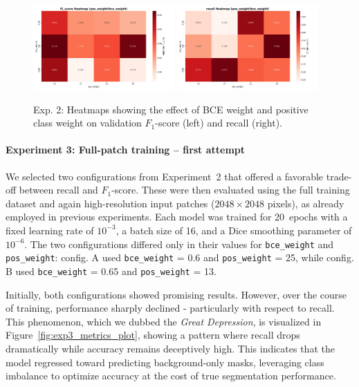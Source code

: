 \documentclass[12pt]{article}
\begin{document}
\begin{figure}[t]
    \centering
    \includegraphics[width=0.48\textwidth]{Images/12_heatmap_f1_score_by_weights.png}
    \includegraphics[width=0.48\textwidth]{Images/12_heatmap_recall_by_weights.png}
    \caption{Exp. 2: Heatmaps showing the effect of BCE weight and positive class weight on validation $F_1$-score (left) and recall (right).}
    \label{fig:exp2_heatmaps}
\end{figure}

\paragraph{Experiment 3: Full-patch training – first attempt} 
We selected two configurations from Experiment~2 that offered a favorable trade-off between recall and $F_1$-score. These were then evaluated using the full training dataset and again high-resolution input patches ($2048 \times 2048$ pixels), as already employed in previous experiments. Each model was trained for 20~epochs with a fixed learning rate of $10^{-3}$, a batch size of 16, and a Dice smoothing parameter of $10^{-6}$. The two configurations differed only in their values for \texttt{bce\_weight} and \texttt{pos\_weight}: config. A used \texttt{bce\_weight} = 0.6 and \texttt{pos\_weight} = 25, while config. B used \texttt{bce\_weight} = 0.65 and \texttt{pos\_weight} = 13.

Initially, both configurations showed promising results. However, over the course of training, performance sharply declined - particularly with respect to recall. This phenomenon, which we dubbed the \emph{Great Depression}, is visualized in Figure~\ref{fig:exp3_metrics_plot}, showing a pattern where recall drops dramatically while accuracy remains deceptively high. This indicates that the model regressed toward predicting background-only masks, leveraging class imbalance to optimize accuracy at the cost of true segmentation performance.
\end{document}
